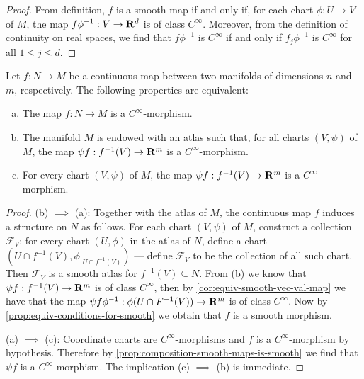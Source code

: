 \begin{proof}
From definition, \(f\) is a smooth map if and only if, for each chart \(\phi: U
\to V\) of \(M\), the map \(f \phi^{-1}: V \to \mathbf{R}^d\) is of class
\(C^{\infty}\). Moreover, from the definition of continuity on real spaces, we
find that \(f \phi^{-1}\) is \(C^{\infty}\) if and only if \(f_j \phi^{-1}\) is
\(C^{\infty}\) for all \(1 \leq j \leq d\).
\end{proof}

\begin{proposition}
\label{prop:smooth-morphisms-from-real-maps}
Let \(f: N \to M\) be a continuous map between two manifolds of dimensions \(n\)
and \(m\), respectively. The following properties are equivalent:
\begin{enumerate}[(a)]\setlength\itemsep{0em}
\item The map \(f: N \to M\) is a \(C^{\infty}\)-morphism.

\item The manifold \(M\) is endowed with an atlas such that, for all charts
  \((V, \psi)\) of \(M\), the map \(\psi f: f^{-1}(V) \to \mathbf{R}^m\) is a
  \(C^{\infty}\)-morphism.

\item For every chart \((V, \psi)\) of \(M\), the map \(\psi f: f^{-1}(V) \to
  \mathbf{R}^m\) is a \(C^{\infty}\)-morphism.
\end{enumerate}
\end{proposition}

\begin{proof}
(b) \(\implies\) (a): Together with the atlas of \(M\), the continuous map \(f\)
induces a structure on \(N\) as follows. For each chart \((V, \psi)\) of \(M\),
construct a collection \(\mathcal{F}_V\): for every chart \((U, \phi)\) in the
atlas of \(N\), define a chart \((U \cap f^{-1}(V), \phi|_{U \cap f^{-1}(V)})\)
--- define \(\mathcal{F}_V\) to be the collection of all such chart. Then
\(\mathcal{F}_V\) is a smooth atlas for \(f^{-1}(V) \subseteq N\). From (b) we
know that \(\psi f: f^{-1}(V) \to \mathbf{R}^m\) is of class \(C^{\infty}\), then by
\cref{cor:equiv-smooth-vec-val-map} we have that the map
\(\psi f \phi^{-1}: \phi(U \cap F^{-1}(V)) \to \mathbf{R}^m\) is of class
\(C^{\infty}\). Now by \cref{prop:equiv-conditions-for-smooth} we obtain that
\(f\) is a smooth morphism.

(a) \(\implies\) (c): Coordinate charts are \(C^{\infty}\)-morphisms and \(f\)
is a \(C^{\infty}\)-morphism by hypothesis. Therefore by
\cref{prop:composition-smooth-maps-is-smooth} we find that \(\psi f\) is a
\(C^{\infty}\)-morphism. The implication (c) \(\implies\) (b) is immediate.
\end{proof}

